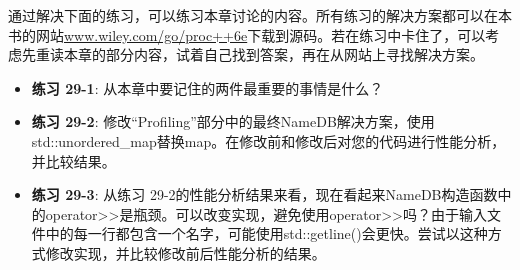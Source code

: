 通过解决下面的练习，可以练习本章讨论的内容。所有练习的解决方案都可以在本书的网站\url{www.wiley.com/go/proc++6e}下载到源码。若在练习中卡住了，可以考虑先重读本章的部分内容，试着自己找到答案，再在从网站上寻找解决方案。

\begin{itemize}
\item
\textbf{练习 29-1}: 从本章中要记住的两件最重要的事情是什么？

\item
\textbf{练习 29-2}: 修改“Profiling”部分中的最终NameDB解决方案，使用std::unordered\_map替换map。在修改前和修改后对您的代码进行性能分析，并比较结果。

\item
\textbf{练习 29-3}: 从练习 29-2的性能分析结果来看，现在看起来NameDB构造函数中的operator>{}>是瓶颈。可以改变实现，避免使用operator>{}>吗？由于输入文件中的每一行都包含一个名字，可能使用std::getline()会更快。尝试以这种方式修改实现，并比较修改前后性能分析的结果。
\end{itemize}






